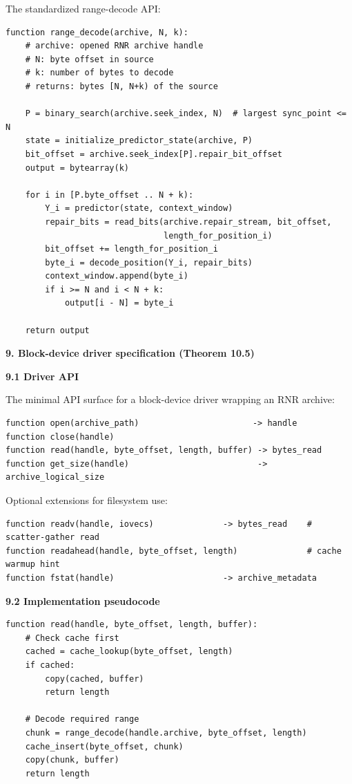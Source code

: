 \documentclass[
]{article}
\begin{document}
The standardized range-decode API:
\begin{verbatim}
function range_decode(archive, N, k):
    # archive: opened RNR archive handle
    # N: byte offset in source
    # k: number of bytes to decode
    # returns: bytes [N, N+k) of the source

    P = binary_search(archive.seek_index, N)  # largest sync_point <= N
    state = initialize_predictor_state(archive, P)
    bit_offset = archive.seek_index[P].repair_bit_offset
    output = bytearray(k)

    for i in [P.byte_offset .. N + k):
        Y_i = predictor(state, context_window)
        repair_bits = read_bits(archive.repair_stream, bit_offset,
                                length_for_position_i)
        bit_offset += length_for_position_i
        byte_i = decode_position(Y_i, repair_bits)
        context_window.append(byte_i)
        if i >= N and i < N + k:
            output[i - N] = byte_i

    return output
\end{verbatim}

\textbf{9. Block-device driver specification (Theorem 10.5)}

\textbf{9.1 Driver API}

The minimal API surface for a block-device driver wrapping an RNR
archive:
\begin{verbatim}
function open(archive_path)                       -> handle
function close(handle)
function read(handle, byte_offset, length, buffer) -> bytes_read
function get_size(handle)                          -> archive_logical_size
\end{verbatim}
Optional extensions for filesystem use:
\begin{verbatim}
function readv(handle, iovecs)              -> bytes_read    # scatter-gather read
function readahead(handle, byte_offset, length)              # cache warmup hint
function fstat(handle)                      -> archive_metadata
\end{verbatim}

\textbf{9.2 Implementation pseudocode}
\begin{verbatim}
function read(handle, byte_offset, length, buffer):
    # Check cache first
    cached = cache_lookup(byte_offset, length)
    if cached:
        copy(cached, buffer)
        return length

    # Decode required range
    chunk = range_decode(handle.archive, byte_offset, length)
    cache_insert(byte_offset, chunk)
    copy(chunk, buffer)
    return length
\end{verbatim}
\end{document}
